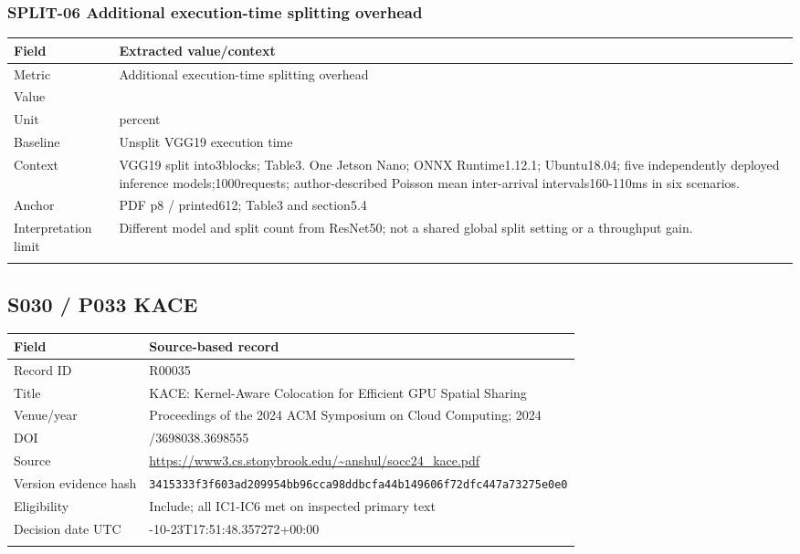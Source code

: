\subsubsection*{SPLIT-06 Additional execution-time splitting overhead}
\begin{longtable}{>{\raggedright\arraybackslash}p{}>{\raggedright\arraybackslash}p{}}
\toprule
\textbf{Field} & \textbf{Extracted value/context}\\\midrule\endhead
Metric & Additional execution-time splitting overhead\\\addlinespace
Value & 18.1\\\addlinespace
Unit & percent\\\addlinespace
Baseline & Unsplit VGG19 execution time\\\addlinespace
Context & VGG19 split into3blocks;\allowbreak{} Table3. One Jetson Nano;\allowbreak{} ONNX Runtime1.12.1;\allowbreak{} Ubuntu18.04;\allowbreak{} five independently deployed inference models;\allowbreak{}1000requests;\allowbreak{} author-described Poisson mean inter-arrival intervals160-110ms in six scenarios.\\\addlinespace
Anchor & PDF p8 / printed612;\allowbreak{} Table3 and section5.4\\\addlinespace
Interpretation limit & Different model and split count from ResNet50;\allowbreak{} not a shared global split setting or a throughput gain.\\\addlinespace
\bottomrule\end{longtable}
\clearpage\subsection{S030 / P033 KACE}
\cite{s030}
\begin{longtable}{>{\raggedright\arraybackslash}p{}>{\raggedright\arraybackslash}p{}}
\toprule
\textbf{Field} & \textbf{Source-based record}\\\midrule\endhead
Record ID & R00035\\\addlinespace
Title & KACE: Kernel-Aware Colocation for Efficient GPU Spatial Sharing\\\addlinespace
Venue/year & Proceedings of the 2024 ACM Symposium on Cloud Computing;\allowbreak{} 2024\\\addlinespace
DOI & 10.1145/3698038.3698555\\\addlinespace
Source & \url{https://www3.cs.stonybrook.edu/~anshul/socc24_kace.pdf}\\\addlinespace
Version evidence hash & \nolinkurl{3415333f3f603ad209954bb96cca98ddbcfa44b149606f72dfc447a73275e0e0}\\\addlinespace
Eligibility & Include;\allowbreak{} all IC1-IC6 met on inspected primary text\\\addlinespace
Decision date UTC & 2026-10-23T17:51:48.357272+00:00\\\addlinespace
\bottomrule\end{longtable}
